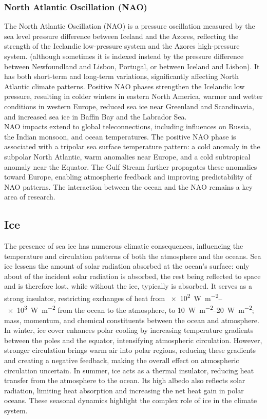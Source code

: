 \subsubsection{North Atlantic Oscillation (NAO)}\label{subsubsec:NAO}
The North Atlantic Oscillation (NAO) is a pressure oscillation measured by the sea level pressure difference between Iceland and the Azores, reflecting the strength of the Icelandic low-pressure system and the Azores high-pressure system. (although sometimes it is indexed instead by the pressure difference between Newfoundland and Lisbon, Portugal, or between Iceland and Lisbon). It has both short-term and long-term variations, significantly affecting North Atlantic climate patterns. Positive NAO phases strengthen the Icelandic low pressure, resulting in colder winters in eastern North America, warmer and wetter conditions in western Europe, reduced sea ice near Greenland and Scandinavia, and increased sea ice in Baffin Bay and the Labrador Sea. \\
NAO impacts extend to global teleconnections, including influences on Russia, the Indian monsoon, and ocean temperatures. The positive NAO phase is associated with a tripolar sea surface temperature pattern: a cold anomaly in the subpolar North Atlantic, warm anomalies near Europe, and a cold subtropical anomaly near the Equator. The Gulf Stream further propagates these anomalies toward Europe, enabling atmospheric feedback and improving predictability of NAO patterns. The interaction between the ocean and the NAO remains a key area of research.

\subsection{Ice}\label{subsec:ice-interconnections}
The presence of sea ice has numerous climatic consequences, influencing the temperature and circulation patterns of both the atmosphere and the oceans. Sea ice lessens the amount of solar radiation absorbed at the ocean's surface: only about  of the incident solar radiation is absorbed, the rest being reflected to space and is therefore lost, while without the ice, typically  is absorbed.
It serves as a strong insulator, restricting exchanges of heat from \qtyrange{e2}{e3}{\watt\per\meter\squared} from the ocean to the atmosphere, to \qtyrange{10}{20}{\watt\per\meter\squared};
mass, momentum, and chemical constituents between the ocean and atmosphere. \\
In winter, ice cover enhances polar cooling by increasing temperature gradients between the poles and the equator, intensifying atmospheric circulation. However, stronger circulation brings warm air into polar regions, reducing these gradients and creating a negative feedback, making the overall effect on atmospheric circulation uncertain. In summer, ice acts as a thermal insulator, reducing heat transfer from the atmosphere to the ocean. Its high albedo also reflects solar radiation, limiting heat absorption and increasing the net heat gain in polar oceans. These seasonal dynamics highlight the complex role of ice in the climate system.\\

